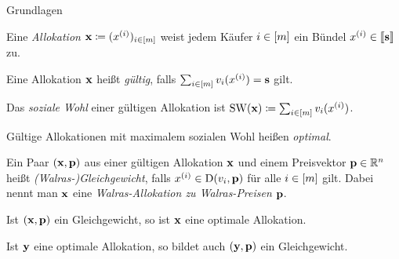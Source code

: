 \begin{frame}{Grundlagen}
	\begin{definition}[Allokation]
		Eine \emph{Allokation} $\mathbf{x}\coloneqq(x^{(i)})_{i\in\left[ m \right]}$ weist jedem Käufer $i\in\left[ m \right]$ ein Bündel $x^{(i)}\in\left\llbracket \mathbf{s} \right\rrbracket$ zu.
		\pause
		
		Eine Allokation $\mathbf{x}$ heißt \emph{gültig}, falls $\sum_{i\in\left[ m \right]}v_i(x^{(i)}) = \mathbf{s}$ gilt.
		\pause 
		
		Das \emph{soziale Wohl} einer gültigen Allokation ist $\operatorname{SW}(\mathbf{x})\coloneqq \sum_{i\in\left[ m \right]} v_i(x^{(i)})$.
		
		Gültige Allokationen mit maximalem sozialen Wohl heißen \emph{optimal}.
	\end{definition}
	
	\pause
	\begin{definition}
		Ein Paar $(\mathbf{x}, \mathbf{p})$ aus einer gültigen Allokation $\mathbf{x}$ und einem Preisvektor $\mathbf{p}\in\mathbb{R}^n$ heißt \emph{(Walras-)Gleichgewicht}, falls $x^{(i)}\in\operatorname{D}(v_i, \mathbf{p})$ für alle $i\in\left[ m \right]$ gilt.
		Dabei nennt man $\mathbf{x}$ eine \emph{Walras-Allokation zu Walras-Preisen} $\mathbf{p}$.
	\end{definition}

	\pause
	\begin{lemma}[Wohlfahrtstheoreme]
		Ist $(\mathbf{x}, \mathbf{p})$ ein Gleichgewicht, so ist $\mathbf{x}$ eine optimale Allokation.
		
		Ist $\mathbf{y}$ eine optimale Allokation, so bildet auch $(\mathbf{y}, \mathbf{p})$ ein Gleichgewicht.
	\end{lemma}
\end{frame}



